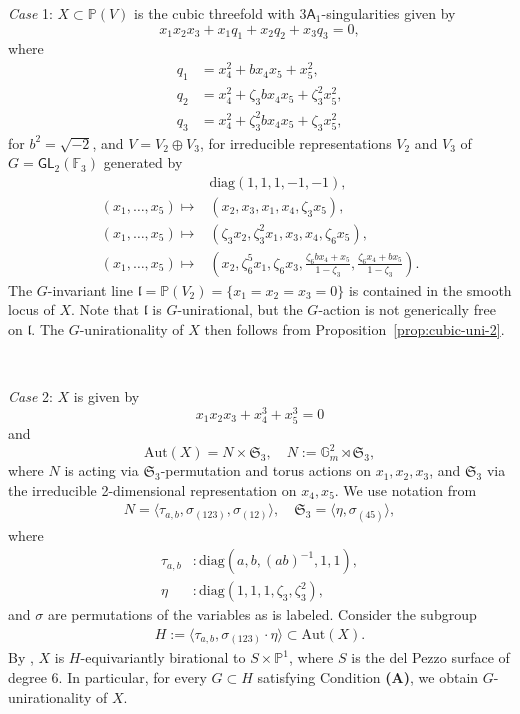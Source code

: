 \documentclass[12pt,reqno]{amsart}
\theoremstyle{plain}
\theoremstyle{remark}
\theoremstyle{definition}
\numberwithin{equation}{section}
\def\sA{{\mathsf A}}
\def\fS{{\mathfrak S}}
\def\fS{{\mathfrak S}}
\def\bG{{\mathbb G}}
\def\bP{{\mathbb P}}
\def\bF{{\mathbb F}}
\def\Aut{\mathrm{Aut}}
\def\GL{\mathsf{GL}}
\begin{document}
{\em Case} 1:  $X\subset \bP(V)$ is the cubic threefold with $3\sA_1$-singularities given by 
$$
x_1x_2x_3+x_1q_1+x_2q_2+x_3q_3=0,
$$
where \begin{align*}
    q_1&=x_4^2+bx_4x_5+x_5^2,\\
    q_2&=x_4^2+\zeta_3bx_4x_5+\zeta_3^2x_5^2,\\
    q_3&=x_4^2+\zeta_3^2bx_4x_5+\zeta_3x_5^2,
\end{align*}
for $b^2=\sqrt{-2}$, and $V=V_2\oplus V_3$, for irreducible representations $V_2$ and $V_3$ of $G=\GL_2(\bF_3)$ generated by 
\begin{align*}
    &\mathrm{diag}(1,1,1,-1,-1),\\
(x_1,\ldots,x_5)\mapsto&(x_2,x_3,x_1,x_4,\zeta_3x_5),\\(x_1,\ldots,x_5)\mapsto&(\zeta_3x_2,\zeta_3^2x_1,x_3,x_4,\zeta_6x_5),\\
(x_1,\ldots,x_5)\mapsto&(x_2,\zeta_6^5x_1,\zeta_6x_3,\frac{\zeta_6bx_4+x_5}{1-\zeta_3},\frac{\zeta_6x_4+bx_5}{1-\zeta_3}).
\end{align*}
The $G$-invariant line $\mathfrak l =\bP(V_2)=\{x_1=x_2=x_3=0\}$ is contained in the smooth locus of $X$. Note that $\mathfrak l$ is $G$-unirational, but the $G$-action is not generically free on $\mathfrak l$.   The 
$G$-unirationality of $X$ then follows from Proposition~\ref{prop:cubic-uni-2}.

\ 


{\em Case} 2: $X$ is given by 
\begin{equation} 
\label{eqn:cubic-123}
x_1x_2x_3+x_4^3+x_5^3=0
\end{equation}
and 
$$
\Aut(X)=N\times \fS_3, \quad N:=\bG_m^2\rtimes\fS_3, 
$$
where $N$ is 
acting via $\fS_3$-permutation and torus actions on $x_1,x_2,x_3$, and $\fS_3$ via the irreducible 2-dimensional representation on $x_4,x_5$. We use notation from \cite[Proposition 6.6]{CMTZ}
\begin{align}\label{eqn:3D4aut}
    N=\langle \tau_{a,b}, \sigma_{(123)}, \sigma_{(12)}\rangle,\quad 
\fS_3=\langle \eta, \sigma_{(45)}\rangle, 
\end{align}
where
\begin{align*}
    \tau_{a,b}&:\mathrm{diag}(a,b,(ab)^{-1},1,1),\\
    \eta&:\mathrm{diag}(1,1,1,\zeta_3,\zeta_3^2),
\end{align*}
and
$\sigma$ are permutations of the variables as is labeled.
Consider the subgroup 
\begin{align}\label{eqn:3D4H}
H:=\langle \tau_{a,b}, \sigma_{(123)}\cdot \eta\rangle\subset \Aut(X). 
\end{align}
By \cite[Proposition 6.6]{CMTZ}, $X$ is $H$-equivariantly birational to $S\times \bP^1$, where $S$ is the del Pezzo surface of degree 6. In particular, for every $G\subset H$ satisfying Condition {\bf (A)}, we obtain $G$-unirationality of $X$. 
\end{document}
